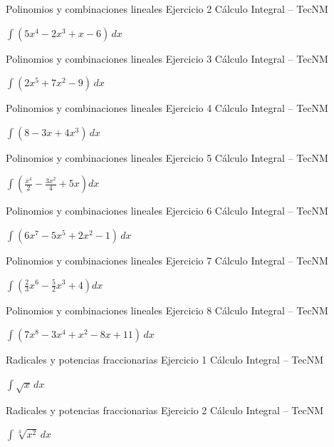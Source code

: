 \documentclass[aspectratio=169,12pt]{beamer}
\newcommand{\ejercicio}[1]{%
  \begin{center}
  \vfill
  {\fontsize{24}{30}\selectfont #1}
  \vfill
  \end{center}
}
\begin{document}
\begin{frame}{Polinomios y combinaciones lineales}
\small Ejercicio 2 \hfill Cálculo Integral -- TecNM
\ejercicio{$\displaystyle \int(5x^4-2x^3+x-6)\,dx$}
\end{frame}

\begin{frame}{Polinomios y combinaciones lineales}
\small Ejercicio 3 \hfill Cálculo Integral -- TecNM
\ejercicio{$\displaystyle \int(2x^5+7x^2-9)\,dx$}
\end{frame}

\begin{frame}{Polinomios y combinaciones lineales}
\small Ejercicio 4 \hfill Cálculo Integral -- TecNM
\ejercicio{$\displaystyle \int(8-3x+4x^3)\,dx$}
\end{frame}

\begin{frame}{Polinomios y combinaciones lineales}
\small Ejercicio 5 \hfill Cálculo Integral -- TecNM
\ejercicio{$\displaystyle \int\left(\frac{x^4}{2}-\frac{3x^2}{4}+5x\right)dx$}
\end{frame}

\begin{frame}{Polinomios y combinaciones lineales}
\small Ejercicio 6 \hfill Cálculo Integral -- TecNM
\ejercicio{$\displaystyle \int(6x^7-5x^5+2x^2-1)\,dx$}
\end{frame}

\begin{frame}{Polinomios y combinaciones lineales}
\small Ejercicio 7 \hfill Cálculo Integral -- TecNM
\ejercicio{$\displaystyle \int\left(\frac{2}{3}x^6-\frac{5}{2}x^3+4\right)dx$}
\end{frame}

\begin{frame}{Polinomios y combinaciones lineales}
\small Ejercicio 8 \hfill Cálculo Integral -- TecNM
\ejercicio{$\displaystyle \int(7x^8-3x^4+x^2-8x+11)\,dx$}
\end{frame}

\begin{frame}{Radicales y potencias fraccionarias}
\small Ejercicio 1 \hfill Cálculo Integral -- TecNM
\ejercicio{$\displaystyle \int \sqrt{x}\,dx$}
\end{frame}

\begin{frame}{Radicales y potencias fraccionarias}
\small Ejercicio 2 \hfill Cálculo Integral -- TecNM
\ejercicio{$\displaystyle \int \sqrt[3]{x^2}\,dx$}
\end{frame}
\end{document}
